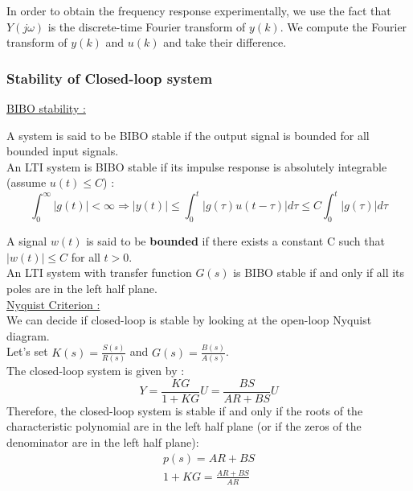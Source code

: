 \documentclass[../main.tex]{subfiles}
\begin{document}
In order to obtain the frequency response experimentally, we use the fact that $Y(j\omega)$ is the discrete-time Fourier transform of $y(k)$. We compute the Fourier transform of $y(k)$ and $u(k)$ and take their difference.\\

\subsubsection{Stability of Closed-loop system}

\quad \underline{BIBO stability :}\\
\begin{theorem}
    A system is said to be BIBO stable if the output signal is bounded for all bounded input signals.\\
    An LTI system is BIBO stable if its impulse response is absolutely integrable (assume $u(t) \leq C$) : \begin{equation}
        \int_0^\infty \lvert g(t)\rvert < \infty \Rightarrow \lvert y(t) \rvert \leq \int_0^t \lvert g(\tau) u(t-\tau)\rvert d\tau \leq C\int_0^t \lvert g(\tau)\rvert d\tau
    \end{equation}
\end{theorem}

\warning A signal $w(t)$ is said to be \textbf{bounded} if there exists a constant C such that $\lvert w(t)\rvert \leq C$ for all $t>0$.\\

An LTI system with transfer function $G(s)$ is BIBO stable if and only if all its poles are in the left half plane.\\

\quad \underline{Nyquist Criterion :}\\
We can decide if closed-loop is stable by looking at the open-loop Nyquist diagram.\\

Let's set $K(s) = \frac{S(s)}{R(s)}$ and $G(s) = \frac{B(s)}{A(s)}$.\\

The closed-loop system is given by : \begin{equation}
    Y = \frac{KG}{1+KG} U= \frac{BS}{AR+BS} U
\end{equation}
Therefore, the closed-loop system is stable if and only if the roots of the characteristic polynomial are in the left half plane (or if the zeros of the denominator are in the left half plane): \begin{equation}
    \begin{gathered}
        p(s) = AR+BS\\
        1 + KG = \frac{AR+BS}{AR}\\
    \end{gathered}
\end{equation}
\end{document}
